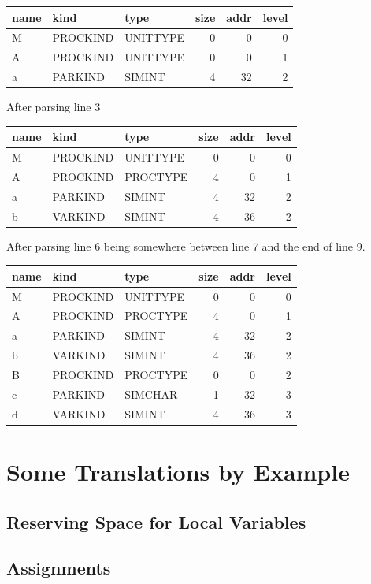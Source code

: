\documentclass[11pt]{report}
\begin{document}
\begin{tabular}{lllrrr}
name & kind & type & size & addr & level \\
\hline
M & PROCKIND & UNITTYPE & 0 & 0 & 0 \\
A & PROCKIND & UNITTYPE & 0 & 0 & 1 \\
a & PARKIND & SIMINT & 4 & 32 & 2
\end{tabular}

After parsing line 3

\begin{tabular}{lllrrr}
name & kind & type & size & addr & level \\
\hline
M & PROCKIND & UNITTYPE & 0 & 0 & 0 \\
A & PROCKIND & PROCTYPE & 4 & 0 & 1 \\
a & PARKIND & SIMINT & 4 & 32 & 2 \\
b & VARKIND & SIMINT & 4 & 36 & 2
\end{tabular}

After parsing line 6 being somewhere between line 7 and the end of line 9.

\begin{tabular}{lllrrr}
name & kind & type & size & addr & level \\
\hline
M & PROCKIND & UNITTYPE & 0 & 0 & 0 \\
A & PROCKIND & PROCTYPE & 4 & 0 & 1 \\
a & PARKIND & SIMINT & 4 & 32 & 2 \\
b & VARKIND & SIMINT & 4 & 36 & 2 \\
B & PROCKIND & PROCTYPE & 0 & 0 & 2 \\
c & PARKIND & SIMCHAR & 1 & 32 & 3 \\
d & VARKIND & SIMINT & 4 & 36 & 3
\end{tabular}



\chapter{Some Translations by Example}
\section{Reserving Space for Local Variables}

\section{Assignments}
\end{document}
